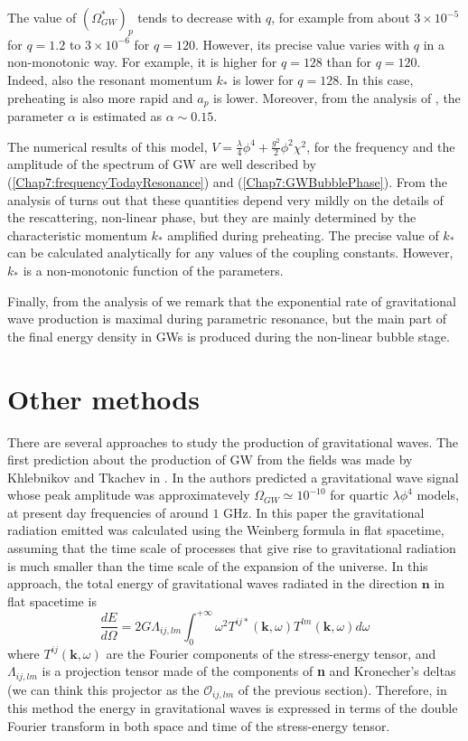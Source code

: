 \documentclass[11pt,a4paper,twoside]{book}
\begin{document}
The value of $ (\Omega_{GW}^{*})_{p} $ tends to decrease with $ q $, for example from about $ 3 \times 10^{-5} $ for $ q=1.2 $ to $ 3 \times 10^{-6} $ for $ q=120 $. However, its precise value varies with $ q $ in a non-monotonic way. For example, it is higher for $ q=128 $ than for $ q=120 $.  Indeed, also the resonant momentum $ k_{*} $ is lower for $ q=128 $. In this case, preheating is also more rapid and $ a_{p} $ is lower. Moreover, from the analysis of \cite{Chap7:GreenMethod}, the parameter $\alpha$ is estimated as $\alpha \sim 0.15$.

The numerical results of this model, $ V=\frac{\lambda}{4}\phi^{4}+\frac{g^{2}}{2}\phi^{2}\chi^{2}  $, for the frequency and the amplitude of the spectrum of GW are well described by (\ref{Chap7:frequencyTodayResonance}) and (\ref{Chap7:GWBubblePhase}). From the analysis of \cite{Chap7:GreenMethod}  turns out that these quantities depend very mildly on the details of the rescattering, non-linear phase, but they are mainly determined by the characteristic momentum $ k_{*} $ amplified during preheating. The precise value of $ k_{*} $ can be calculated analytically for any values of the coupling constants. However, $ k_* $ is a non-monotonic function of the parameters.

Finally, from the analysis of \cite{Chap7:BoxMethod} we remark that the exponential rate of gravitational wave production is maximal during parametric resonance, but the main part of the final energy density in GWs is produced during the non-linear bubble stage.

\section{Other methods}
There are several approaches to study the production of gravitational waves. The first prediction about the production of GW from the fields was made by Khlebnikov and Tkachev in \cite{Chap7:WeinbergBoxMethod}. In \cite{Chap7:WeinbergBoxMethod} the authors predicted a gravitational wave signal whose peak amplitude was approximatevely $ \Omega_{GW}  \simeq 10^{-10}$ for quartic $\lambda \phi^{4}$ models, at present day frequencies of around $ 1$ GHz. In this paper the gravitational radiation emitted was calculated using the Weinberg formula in flat spacetime, assuming that the time scale of processes that give rise to gravitational radiation is much smaller than the time scale of the expansion of the universe. In this approach, the total energy of gravitational waves radiated in the direction $ \textbf{n} $ in flat spacetime  is 
\begin{equation}
\label{Chap7:WeinbergFormula}
\frac{dE}{d\Omega} = 2 G \Lambda_{ij,lm}\int_{0}^{+\infty} \omega^{2} T^{ij*}(\textbf{k},\omega)T^{lm}(\textbf{k},\omega)d\omega
\end{equation}
where $ T^{ij}(\textbf{k},\omega) $ are the Fourier components of the stress-energy tensor, and $ \Lambda_{ij,lm} $ is a projection tensor made of the components of \textbf{n} and Kronecher's deltas (we can think this projector as the $ \mathcal{O}_{ij,lm} $ of the previous section). Therefore, in this method the energy in gravitational waves is expressed in terms of the double Fourier transform in both space and time of the stress-energy tensor.
\end{document}
